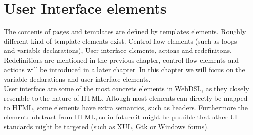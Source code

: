 \chapter{User Interface elements}
The contents of pages and templates are defined by templates elements. Roughly different kind of template elements exist. Control-flow elements (such as loops and variable declarations), User interface elements, actions and redefinitons. Redefinitions are mentioned in the previous chapter, control-flow elements and actions will be introduced in a later chapter. In this chapter we will focus on the variable declarations and user interface elements.
\\ 
User interface are some of the most concrete elements in WebDSL, as they closely resemble to the nature of HTML. Altough most elements can directly be mapped to HTML, some elements have extra semantics, such as headers. Furthermore the elements abstract from HTML, so in future it might be possible that other UI standards might be targeted (such as XUL, Gtk or Windows forms). 

